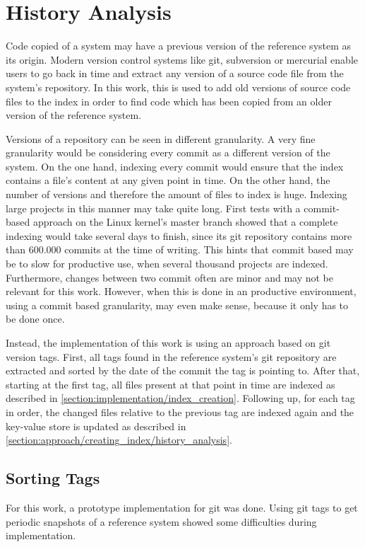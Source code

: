 \section{History Analysis}\label{section:implementation/history_analysis}
Code copied of a system may have a previous version of the reference system as its origin.
Modern version control systems like git, subversion or mercurial enable users to go back in time and extract any version of a source code file from the system's repository.
In this work, this is used to add old versions of source code files to the index in order to find code which has been copied from an older version of the reference system.

Versions of a repository can be seen in different granularity.
A very fine granularity would be considering every commit as a different version of the system.
On the one hand, indexing every commit would ensure that the index contains a file's content at any given point in time.
On the other hand, the number of versions and therefore the amount of files to index is huge.
Indexing large projects in this manner may take quite long.
First tests with a commit-based approach on the Linux kernel's master branch showed that a complete indexing would take several days to finish, since its git repository contains more than 600.000 commits at the time of writing.
This hints that commit based may be to slow for productive use, when several thousand projects are indexed.
Furthermore, changes between two commit often are minor and may not be relevant for this work.
However, when this is done in an productive environment, using a commit based granularity, may even make sense, because it only has to be done once.

Instead, the implementation of this work is using an approach based on git version tags.
First, all tags found in the reference system's git repository are extracted and sorted by the date of the commit the tag is pointing to.
After that, starting at the first tag, all files present at that point in time are indexed as described in \autoref{section:implementation/index_creation}.
Following up, for each tag in order, the changed files relative to the previous tag are indexed again and the key-value store is updated as described in \autoref{section:approach/creating_index/history_analysis}.

\subsection{Sorting Tags}\label{section:implementation/history_analysis/sorting_tags}
For this work, a prototype implementation for git was done.
Using git tags to get periodic snapshots of a reference system showed some difficulties during implementation.

